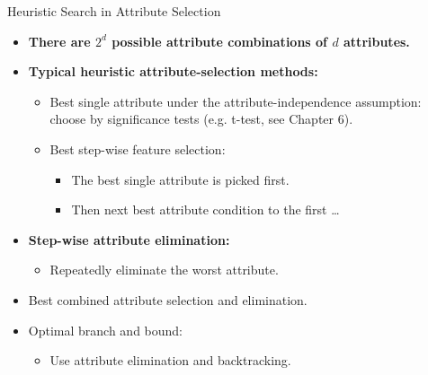 \begin{frame}{Heuristic Search in Attribute Selection}
	\begin{itemize}
		\item \textbf{There are $2^d$ possible attribute combinations of $d$ 
		attributes.}
		\item\textbf{\color{airforceblue}Typical heuristic attribute-selection 
		methods:}
		\begin{itemize}
			\item Best single attribute under the attribute-independence 
			assumption: \\ choose by significance tests (e.g. t-test, see 
			Chapter 6).
			\item Best step-wise feature selection:
			\begin{itemize}
				\item The best single attribute is picked first.
				\item Then next best attribute condition to the first \ldots
			\end{itemize}
		\end{itemize}
		\item \textbf{\color{airforceblue}Step-wise attribute elimination:}
		\begin{itemize}
			\item Repeatedly eliminate the worst attribute.
		\end{itemize}
		\item Best combined attribute selection and elimination.
		\item Optimal branch and bound:
		\begin{itemize}
			\item Use attribute elimination and backtracking.
		\end{itemize}
	\end{itemize}
\end{frame}

